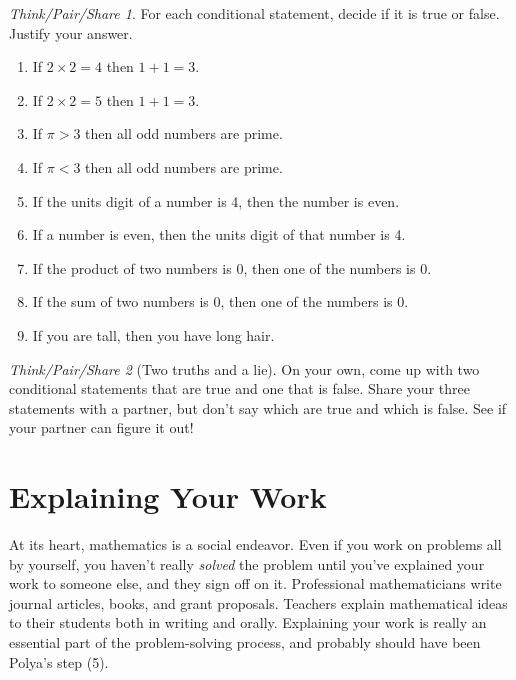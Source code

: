 \documentclass[10pt, reqno]{amsart}
\theoremstyle{remark}
\newtheorem*{thinkpair*}{Think/Pair/Share}
\theoremstyle{definition}
\numberwithin{equation}{section}  %
\begin{document}
\begin{thinkpair*}
For each conditional statement, decide if it is true or false.  Justify your answer.  
\begin{enumerate}
\item
If $2 \times 2 = 4$ then $1 + 1 = 3$.

\item
If $2 \times 2 = 5$ then $1 + 1 = 3$.


\item
If $\pi > 3$ then all odd numbers are prime.

 \item
If $\pi < 3$ then all odd numbers are prime.


\item
If the units digit of a number is 4, then the number is even.

\item
If a number is even, then the units digit of that number is 4.

\item
If the product of two numbers is 0, then one of the numbers is 0.

\item
If the sum of two numbers is 0, then one of the numbers is 0.

\item
If you are tall, then you have long hair.



\end{enumerate}
\end{thinkpair*}


\begin{thinkpair*}[Two truths and a lie]
On your own, come up with two conditional statements that are true and one that is false.  Share your three statements with a partner, but don't say which are true and which is false.  See if your partner can figure it out!
\end{thinkpair*}



\section{Explaining Your Work}
At its heart, mathematics is a social endeavor.  Even if you work on problems all by yourself, you haven't really \emph{solved} the problem until you've explained your work to someone else, and they sign off on it.  Professional mathematicians write journal articles, books, and grant proposals.  Teachers explain mathematical ideas to their students both in writing and orally.  
Explaining your work is really an essential part of the problem-solving process, and probably should have been Polya's step (5).
\end{document}
